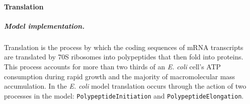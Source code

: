 \documentclass[12pt]{article}
\begin{document}
\baselineskip24pt

\paragraph{Translation}

\subparagraph{Model implementation.}
Translation is the process by which the coding sequences of mRNA transcripts are translated by 70S ribosomes into polypeptides that then fold into proteins. This process accounts for more than two thirds of an \emph{E. coli} cell's ATP consumption during rapid growth \cite{Russell:1995vc} and the majority of macromolecular mass accumulation. In the \emph{E. coli} model  translation occurs through the action of two processes in the model: \texttt{PolypeptideInitiation} and \texttt{PolypeptideElongation}.
\end{document}
